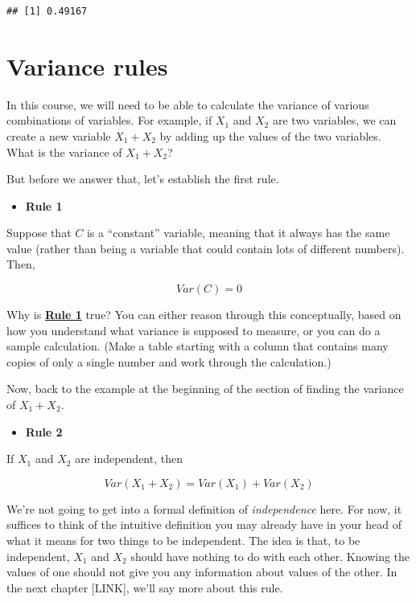 \documentclass[
]{book}
\providecommand{\tightlist}{%
  \setlength{\itemsep}{0pt}\setlength{\parskip}{0pt}}
\begin{document}
\begin{verbatim}
## [1] 0.49167
\end{verbatim}

\hypertarget{variance-rules}{%
\section{Variance rules}\label{variance-rules}}

In this course, we will need to be able to calculate the variance of various combinations of variables. For example, if \(X_{1}\) and \(X_{2}\) are two variables, we can create a new variable \(X_{1} + X_{2}\) by adding up the values of the two variables. What is the variance of \(X_{1} + X_{2}\)?

But before we answer that, let's establish the first rule.

\begin{itemize}
\tightlist
\item
  \textbf{Rule 1}
\end{itemize}

Suppose that \(C\) is a ``constant'' variable, meaning that it always has the same value (rather than being a variable that could contain lots of different numbers). Then,

\[
Var\left(C\right) = 0
\]

Why is \protect\hyperlink{Rule1}{\textbf{Rule 1}} true? You can either reason through this conceptually, based on how you understand what variance is supposed to measure, or you can do a sample calculation. (Make a table starting with a column that contains many copies of only a single number and work through the calculation.)

Now, back to the example at the beginning of the section of finding the variance of \(X_{1} + X_{2}\).

\begin{itemize}
\tightlist
\item
  \textbf{Rule 2}
\end{itemize}

If \(X_{1}\) and \(X_{2}\) are independent, then

\[
Var\left(X_{1} + X_{2}\right) =
Var\left(X_{1}\right) + Var\left(X_{2}\right)
\]

We're not going to get into a formal definition of \emph{independence} here. For now, it suffices to think of the intuitive definition you may already have in your head of what it means for two things to be independent. The idea is that, to be independent, \(X_{1}\) and \(X_{2}\) should have nothing to do with each other. Knowing the values of one should not give you any information about values of the other. In the next chapter {[}LINK{]}, we'll say more about this rule.
\end{document}
